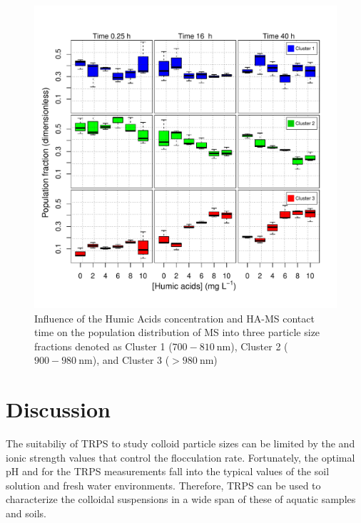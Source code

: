 \documentclass[journal=langd5,manuscript=article]{achemso}
\begin{document}
\begin{figure}
 \includegraphics[width=\linewidth]{Figures/Boxplot_MS_HA_CaCl2_populations.pdf}
  \caption{Influence of the Humic Acids concentration and HA-MS contact time on the population distribution of MS into three particle size fractions denoted as
  Cluster 1 ($700 - 810~\mathrm{nm}$),  Cluster 2 ($900 - 980~\mathrm{nm}$), 
  and
  Cluster 3 ($ > 980~\mathrm{nm}$)
  }
  \label{fgr:boxplot_populations}
\end{figure}






\section{Discussion}


%
The suitabiliy of TRPS to study colloid particle sizes
can be limited by the  and ionic strength  values that  control the flocculation rate.
Fortunately, the optimal pH and \ce{[Ca^{2+}]} for the TRPS measurements fall into the
typical values of the
soil solution\cite{wolt1994soil}
and  fresh water environments\cite{Stumm1993}.
Therefore, TRPS can be used to characterize the colloidal suspensions in a wide span of these of  aquatic samples and soils.
\end{document}
